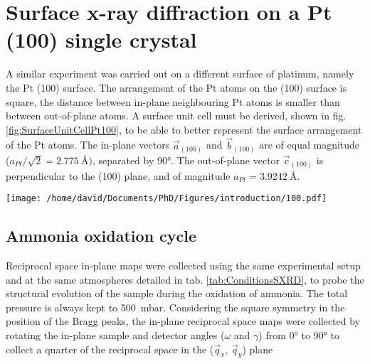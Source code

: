 \newpage
\section{Surface x-ray diffraction on a Pt (100) single crystal} \label{sec:SXRD100}


A similar experiment was carried out on a different surface of platinum, namely the Pt (100) surface.
The arrangement of the Pt atoms on the (100) surface is square, the distance between in-plane neighbouring Pt atoms is smaller than between out-of-plane atoms.
A surface unit cell must be derived, shown in fig. \ref{fig:SurfaceUnitCellPt100}, to be able to better represent the surface arrangement of the Pt atoms.
The in-plane vectors $\vec{a}_{(100)}$ and $\vec{b}_{(100)}$ are of equal magnitude ($a_{Pt} / \sqrt{2} = \qty{2.775}{\angstrom})$, separated by \ang{90}.
The out-of-plane vector $\vec{c}_{(100)}$ is perpendicular to the (100) plane, and of magnitude $a_{Pt} = \qty{3.9242}{\angstrom}$.

\begin{SCfigure}
    \centering
    \texttt{[image: /home/david/Documents/PhD/Figures/introduction/100.pdf]}
    \caption{
        Face-entered cubic unit cell of Pt with $(100)$ crystallographic plane drawn in green.
        $\vec{a}_{(100)}$, $\vec{b}_{(100)}$ and $\vec{c}_{(100)}$ are the $(100)$ surface unit cell vectors.
    }
    \label{fig:SurfaceUnitCellPt100}
\end{SCfigure}

\subsection{Ammonia oxidation cycle}

Reciprocal space in-plane maps were collected using the same experimental setup and at the same atmospheres detailed in tab. \ref{tab:ConditionsSXRD}, to probe the structural evolution of the sample during the oxidation of ammonia.
The total pressure is always kept to \qty{500}{\milli\bar}.
Considering the square symmetry in the position of the Bragg peaks, the in-plane reciprocal space maps were collected by rotating the in-plane sample and detector angles ($\omega$ and $\gamma$) from \ang{0} to \ang{90} to collect a quarter of the reciprocal space in the ($\vec{q}_x$, $\vec{q}_y$) plane

